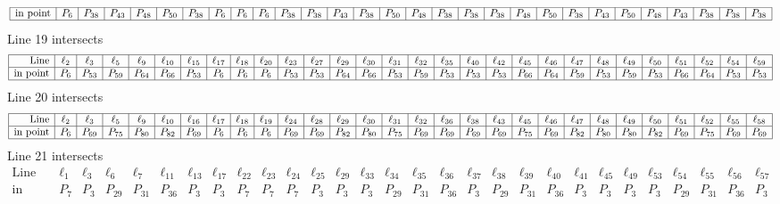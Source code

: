 \documentclass{article}
\begin{document}
{$$\begin{array}{|r*{28}{|c}|}
\hline
\mbox{in point}  & P_{6} & P_{38} & P_{43} & P_{48} & P_{50} & P_{38} & P_{6} & P_{6} & P_{6} & P_{38} & P_{38} & P_{43} & P_{38} & P_{50} & P_{48} & P_{38} & P_{38} & P_{38} & P_{48} & P_{50} & P_{38} & P_{43} & P_{50} & P_{48} & P_{43} & P_{38} & P_{38} & P_{38}\\
\hline
\end{array}
$$
Line 19 intersects 
$$
\begin{array}{|r*{28}{|c}|}
\hline
\mbox{Line}  & \ell_{2} & \ell_{3} & \ell_{5} & \ell_{9} & \ell_{10} & \ell_{15} & \ell_{17} & \ell_{18} & \ell_{20} & \ell_{23} & \ell_{27} & \ell_{29} & \ell_{30} & \ell_{31} & \ell_{32} & \ell_{35} & \ell_{40} & \ell_{42} & \ell_{45} & \ell_{46} & \ell_{47} & \ell_{48} & \ell_{49} & \ell_{50} & \ell_{51} & \ell_{52} & \ell_{54} & \ell_{59}\\
\hline
\mbox{in point}  & P_{6} & P_{53} & P_{59} & P_{64} & P_{66} & P_{53} & P_{6} & P_{6} & P_{6} & P_{53} & P_{53} & P_{64} & P_{66} & P_{53} & P_{59} & P_{53} & P_{53} & P_{53} & P_{66} & P_{64} & P_{59} & P_{53} & P_{59} & P_{53} & P_{66} & P_{64} & P_{53} & P_{53}\\
\hline
\end{array}
$$
Line 20 intersects 
$$
\begin{array}{|r*{28}{|c}|}
\hline
\mbox{Line}  & \ell_{2} & \ell_{3} & \ell_{5} & \ell_{9} & \ell_{10} & \ell_{16} & \ell_{17} & \ell_{18} & \ell_{19} & \ell_{24} & \ell_{28} & \ell_{29} & \ell_{30} & \ell_{31} & \ell_{32} & \ell_{36} & \ell_{38} & \ell_{43} & \ell_{45} & \ell_{46} & \ell_{47} & \ell_{48} & \ell_{49} & \ell_{50} & \ell_{51} & \ell_{52} & \ell_{55} & \ell_{58}\\
\hline
\mbox{in point}  & P_{6} & P_{69} & P_{75} & P_{80} & P_{82} & P_{69} & P_{6} & P_{6} & P_{6} & P_{69} & P_{69} & P_{82} & P_{80} & P_{75} & P_{69} & P_{69} & P_{69} & P_{69} & P_{75} & P_{69} & P_{82} & P_{80} & P_{80} & P_{82} & P_{69} & P_{75} & P_{69} & P_{69}\\
\hline
\end{array}
$$
Line 21 intersects 
$$
\begin{array}{|r*{28}{|c}|}
\hline
\mbox{Line}  & \ell_{1} & \ell_{3} & \ell_{6} & \ell_{7} & \ell_{11} & \ell_{13} & \ell_{17} & \ell_{22} & \ell_{23} & \ell_{24} & \ell_{25} & \ell_{29} & \ell_{33} & \ell_{34} & \ell_{35} & \ell_{36} & \ell_{37} & \ell_{38} & \ell_{39} & \ell_{40} & \ell_{41} & \ell_{45} & \ell_{49} & \ell_{53} & \ell_{54} & \ell_{55} & \ell_{56} & \ell_{57}\\
\hline
\mbox{in point}  & P_{7} & P_{3} & P_{29} & P_{31} & P_{36} & P_{3} & P_{3} & P_{7} & P_{7} & P_{7} & P_{3} & P_{3} & P_{3} & P_{29} & P_{31} & P_{36} & P_{3} & P_{29} & P_{31} & P_{36} & P_{3} & P_{3} & P_{3} & P_{3} & P_{29} & P_{31} & P_{36} & P_{3}\\

\end{array}$$}
\end{document}
